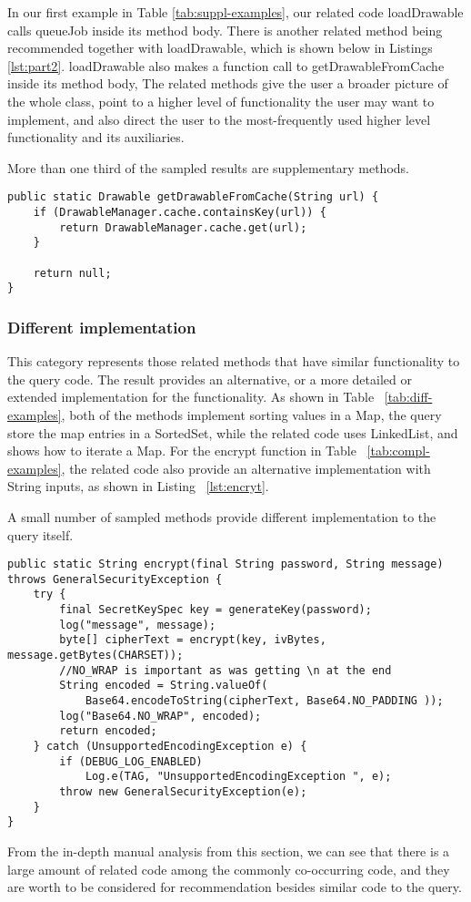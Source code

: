 In our first example in Table \ref{tab:suppl-examples}, our related code {\ttt loadDrawable} calls {\ttt queueJob} inside its method body. 
There is another related method being recommended together with {\ttt loadDrawable}, which is shown below in Listings \ref{lst:part2}. {\ttt loadDrawable} also makes a function call to {\ttt getDrawableFromCache} inside its method body, The related methods give the user a broader picture of the whole class, point to a higher level of functionality the user may want to implement, and also direct the user to the most-frequently used higher level functionality and its auxiliaries.

More than one third of the sampled results are supplementary methods.

\begin{lstlisting}[caption={Recommended code \#2}, label={lst:part2}]
public static Drawable getDrawableFromCache(String url) {
	if (DrawableManager.cache.containsKey(url)) {
		return DrawableManager.cache.get(url);
	}
	
	return null;
}	
\end{lstlisting}

\subsubsection{Different implementation} This category represents those related methods that have similar functionality to the query code. The result provides an alternative, or a more detailed or extended implementation for the functionality. As shown in Table ~\ref{tab:diff-examples}, both of the methods implement sorting values in a {\ttt Map}, the query store the map entries in a {\ttt SortedSet}, while the related code uses {\ttt LinkedList}, and shows how to iterate a {\ttt Map}. For the {\ttt encrypt} function in Table ~\ref{tab:compl-examples}, the related code also provide an alternative implementation with {\ttt String} inputs, as shown in Listing ~\ref{lst:encryt}.

A small number of sampled methods provide different implementation to the query itself.

\begin{lstlisting}[caption={different implementation for \texttt{encrypt}}, label={lst:encryt}]
public static String encrypt(final String password, String message) throws GeneralSecurityException {
	try {
		final SecretKeySpec key = generateKey(password);
		log("message", message);
		byte[] cipherText = encrypt(key, ivBytes, message.getBytes(CHARSET));
		//NO_WRAP is important as was getting \n at the end
		String encoded = String.valueOf(
			Base64.encodeToString(cipherText, Base64.NO_PADDING ));
		log("Base64.NO_WRAP", encoded);
		return encoded;
	} catch (UnsupportedEncodingException e) {
		if (DEBUG_LOG_ENABLED)
			Log.e(TAG, "UnsupportedEncodingException ", e);
		throw new GeneralSecurityException(e);
	}
}
\end{lstlisting}

From the in-depth manual analysis from this section, we can see that there is a large amount of related code among the commonly co-occurring code, and they are worth to be considered for recommendation besides similar code to the query.


